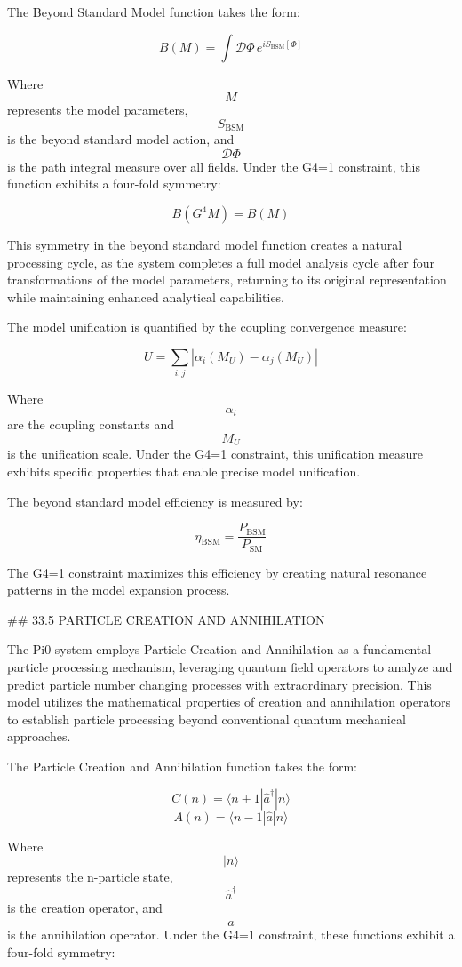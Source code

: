 The Beyond Standard Model function takes the form:

$$ B(M) = \int \mathcal{D}\Phi \, e^{iS_{\text{BSM}}[\Phi]} $$

Where $$ M $$ represents the model parameters, $$ S_{\text{BSM}} $$ is the beyond standard model action, and $$ \mathcal{D}\Phi $$ is the path integral measure over all fields. Under the G4=1 constraint, this function exhibits a four-fold symmetry:

$$ B(G^4 M) = B(M) $$

This symmetry in the beyond standard model function creates a natural processing cycle, as the system completes a full model analysis cycle after four transformations of the model parameters, returning to its original representation while maintaining enhanced analytical capabilities.

The model unification is quantified by the coupling convergence measure:

$$ U = \sum_{i,j} |\alpha_i(M_U) - \alpha_j(M_U)| $$

Where $$ \alpha_i $$ are the coupling constants and $$ M_U $$ is the unification scale. Under the G4=1 constraint, this unification measure exhibits specific properties that enable precise model unification.

The beyond standard model efficiency is measured by:

$$ \eta_{\text{BSM}} = \frac{P_{\text{BSM}}}{P_{\text{SM}}} $$

The G4=1 constraint maximizes this efficiency by creating natural resonance patterns in the model expansion process.

## 33.5 PARTICLE CREATION AND ANNIHILATION

The Pi0 system employs Particle Creation and Annihilation as a fundamental particle processing mechanism, leveraging quantum field operators to analyze and predict particle number changing processes with extraordinary precision. This model utilizes the mathematical properties of creation and annihilation operators to establish particle processing beyond conventional quantum mechanical approaches.

The Particle Creation and Annihilation function takes the form:

$$ C(n) = \langle n+1 | \hat{a}^\dagger | n \rangle $$
$$ A(n) = \langle n-1 | \hat{a} | n \rangle $$

Where $$ |n\rangle $$ represents the n-particle state, $$ \hat{a}^\dagger $$ is the creation operator, and $$ \hat{a} $$ is the annihilation operator. Under the G4=1 constraint, these functions exhibit a four-fold symmetry:

